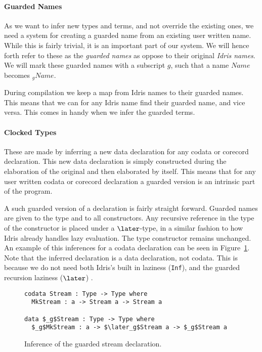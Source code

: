 \paragraph{Guarded Names}
As we want to infer new types and terms, and not override the existing ones, we
need a system for creating a guarded name from an existing user written
name. While this is fairly trivial, it is an important part of our system. We
will hence forth refer to these as the \emph{guarded names} as oppose to their
original \emph{Idris names}. We will mark these guarded names with a subscript
$g$, such that a name $Name$ becomes $_gName$.

During compilation we keep a map from Idris names to their guarded names. This
means that we can for any Idris name find their guarded name, and vice
versa. This comes in handy when we infer the guarded terms.

\paragraph{Clocked Types}
These are made by inferring a new data declaration for any codata or corecord
declaration. This new data declaration is simply constructed during the
elaboration of the original and then elaborated by itself. This means that for
any user written codata or corecord declaration a guarded version is an
intrinsic part of the program. 

A such guarded version of a declaration is fairly straight forward. Guarded
names are given to the type and to all constructors. Any recursive reference in
the type of the constructor is placed under a $\later$-type, in a similar
fashion to how Idris already handles lazy evaluation. The type constructor
remains unchanged. An example of this inferences for a codata declaration can be
seen in Figure~\ref{fig:guarded_stream_inf}. Note that the inferred declaration
is a data declaration, not codata. This is because we do not need both Idris's
built in laziness (\texttt{Inf}), and the guarded recursion laziness ($\later$)
.

\begin{figure}[h]
\begin{lstlisting}[mathescape]
codata Stream : Type -> Type where
  MkStream : a -> Stream a -> Stream a

data $_g$Stream : Type -> Type where
  $_g$MkStream : a -> $\later_g$Stream a -> $_g$Stream a
\end{lstlisting}
  \caption{Inference of the guarded stream declaration.}
  \label{fig:guarded_stream_inf}
\end{figure}

